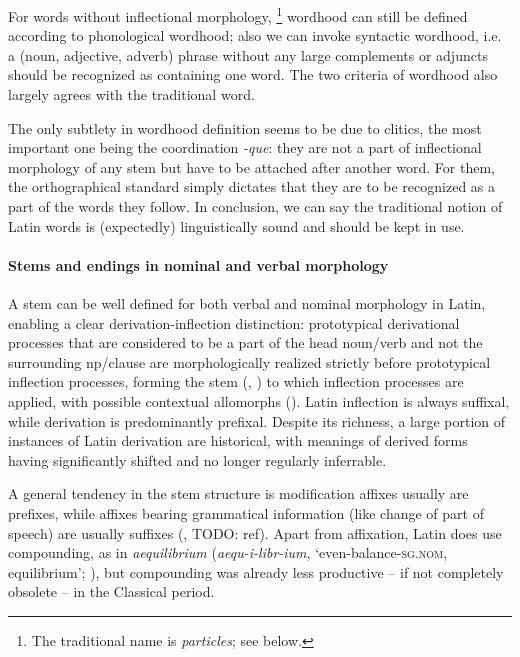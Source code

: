 \documentclass[a4paper, oneside, 12pt]{report}
\newcommand*{\citesec}[1]{\S~{#1}}
\newcommand*{\term}[1]{\emph{#1}}
\newcommand{\form}[1]{\emph{#1}}
\newcommand*{\category}[1]{\textsc{#1}}
\newcommand{\translate}[1]{`#1'}
\begin{document}
For words without inflectional morphology,%
\footnote{
    The traditional name is \term{particles};
    see below.
} 
wordhood can still be defined according to phonological wordhood;
also we can invoke syntactic wordhood, 
i.e. a (noun, adjective, adverb) phrase 
without any large complements or adjuncts should be recognized as 
containing one word.
The two criteria of wordhood also largely agrees with the traditional word.

The only subtlety in wordhood definition seems to be due to clitics, 
the most important one being the coordination \form{-que}: 
they are not a part of inflectional morphology of any stem 
but have to be attached after another word.
For them, the orthographical standard simply dictates that 
they are to be recognized as a part of the words they follow. 
In conclusion, we can say the traditional notion of Latin words 
is (expectedly) linguistically sound 
and should be kept in use.

\paragraph*{Stems and endings in nominal and verbal morphology}

A stem can be well defined for both verbal and nominal morphology in Latin,
enabling a clear derivation-inflection distinction:
prototypical derivational processes that are considered 
to be a part of the head noun/verb 
and not the surrounding \acs{np}/clause
are morphologically realized strictly 
before prototypical inflection processes,
forming the stem 
(,
) to which 
inflection processes are applied,
with possible contextual allomorphs
(). 
Latin inflection is always suffixal,
while derivation is predominantly prefixal.
Despite its richness, 
a large portion of instances of Latin derivation are historical,
with meanings of derived forms 
having significantly shifted and no longer regularly inferrable.

A general tendency in the stem structure 
is modification affixes usually are prefixes,
while affixes bearing grammatical information 
(like change of part of speech) 
are usually suffixes
(, TODO: ref).
Apart from affixation,
Latin does use compounding, as in \form{aequilibrium} 
(\form{aequ-i-libr-ium}, \translate{even-balance-\category{sg.nom}, equilibrium};
\citealt[\citesec{92}]{smith2016greek}),
but compounding was already less productive -- if not completely obsolete --
in the Classical period.
\end{document}

